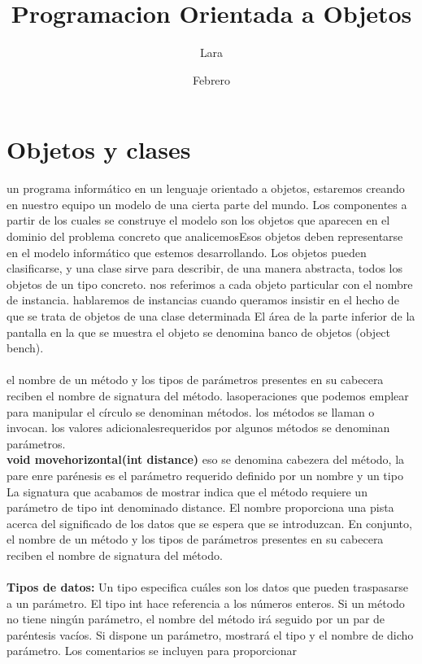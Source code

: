 \documentclass[11pt,a4paper]{article}
\title{Programacion Orientada a Objetos}
\author{Lara}
\date{Febrero}
\begin{document}
	\maketitle
	\section{Objetos y clases}
	un programa informático en un lenguaje orientado a objetos, estaremos creando en
	nuestro equipo un modelo de una cierta parte del mundo. Los componentes a partir de los cuales
	se construye el modelo son los objetos que aparecen en el dominio del problema concreto que
	analicemosEsos objetos deben representarse en el modelo informático que estemos desarrollando. Los objetos pueden clasificarse, y una clase sirve para describir, de una manera abstracta, todos los
	objetos de un tipo concreto. nos referimos a cada objeto particular con el nombre de instancia. hablaremos de instancias cuando queramos insistir en el hecho
	de que se trata de objetos de una clase determinada
	El área de la parte
	inferior de la pantalla en la que se muestra el objeto se denomina banco de objetos (object bench).\\
	\\
	el nombre de un método y los tipos de parámetros presentes en su cabecera
	reciben el nombre de signatura del método. lasoperaciones que podemos emplear para manipular el círculo se denominan métodos. los métodos se llaman o invocan. los valores adicionalesrequeridos por algunos métodos se denominan parámetros.\\ \textbf{void movehorizontal(int distance)} eso se denomina cabezera del método, la pare enre parénesis es el parámetro requerido definido por un nombre y un tipo \\
	La signatura que acabamos
	de mostrar indica que el método requiere un parámetro de tipo int denominado distance.
	El nombre proporciona una pista acerca del significado de los datos que se espera que se introduzcan.
	En conjunto, el nombre de un método y los tipos de parámetros presentes en su cabecera
	reciben el nombre de signatura del método.
	\\
	\\
	\textbf{Tipos de datos: }Un tipo especifica cuáles son los datos que pueden traspasarse a un parámetro. El tipo int hace
	referencia a los números enteros. Si un método no tiene ningún
	parámetro, el nombre del método irá seguido por un par de paréntesis vacíos. Si dispone un parámetro, mostrará el tipo y el nombre de dicho parámetro.
	Los comentarios se incluyen para proporcionar
\end{document}
